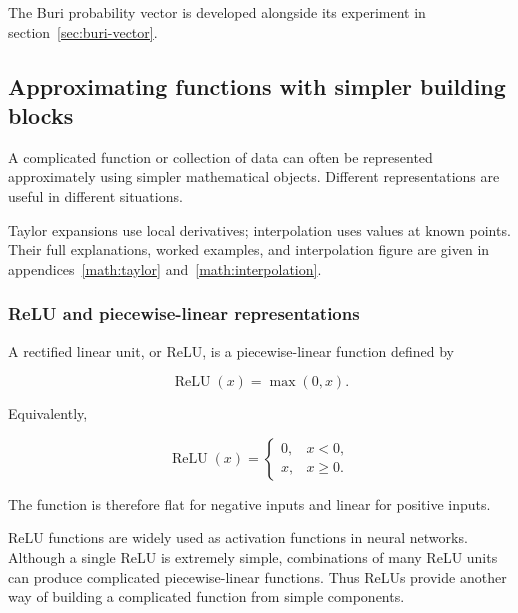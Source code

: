 
The Buri probability vector is developed alongside its experiment in section~\ref{sec:buri-vector}.
\subsection{Approximating functions with simpler building blocks}
\label{sec:approximations}



A complicated function or collection of data can often be represented approximately using simpler mathematical objects.
Different representations are useful in different situations.



Taylor expansions use local derivatives; interpolation uses values at known points.
Their full explanations, worked examples, and interpolation figure are given in appendices~\ref{math:taylor} and~\ref{math:interpolation}.
\subsubsection{ReLU and piecewise-linear representations}
\label{sec:relu}


A rectified linear unit, or ReLU, is a piecewise-linear function defined by

\[
    \boxed{\operatorname{ReLU}(x)=\max(0,x).}
\]

Equivalently,

\[
    \operatorname{ReLU}(x) =
    \begin{cases}
        0, & x<0, \\
        x, & x\geq0.
    \end{cases}\]

The function is therefore flat for negative inputs and linear for positive inputs.

ReLU functions are widely used as activation functions in neural networks.
Although a single ReLU is extremely simple, combinations of many ReLU units can produce complicated piecewise-linear functions.
Thus ReLUs provide another way of building a complicated function from simple components.


